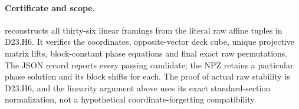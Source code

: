 \paragraph{Certificate and scope.}
 reconstructs all thirty-six
linear framings from the literal raw affine tuples in
D23.H6. It verifies the coordinates, opposite-vector
deck cube, unique projective matrix lifts, block-constant
phase equations and final exact raw permutations.
The JSON record reports every passing candidate; the
NPZ retains a particular phase solution and its block
shifts for each. The proof of actual raw stability is
D23.H6, and the linearity argument above uses its exact
standard-section normalization, not a hypothetical
coordinate-forgetting compatibility.
